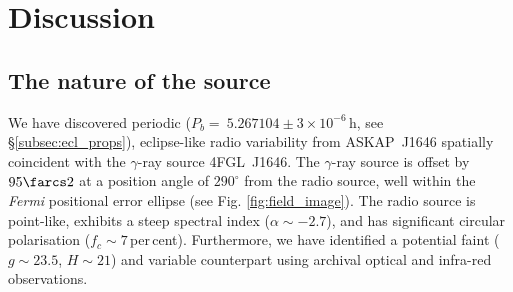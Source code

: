 \documentclass[fleqn,usenatbib]{mnras}
\newcommand{\todo}[1]{\textcolor{red}{TODO: #1}\PackageWarning{TODO:}{#1!}}
\newcommand{\fermi}{\textit{Fermi}}
\newcommand{\blinky}{{4FGL}~J1646}
\newcommand{\blinkyaskap}{{ASKAP}~J1646}
\newcommand{\periodh}{$5.267104\pm{3\times 10^{-6}}$}
\begin{document}







\section{Discussion}\label{sec:discussion}

\subsection{The nature of the source}

We have discovered periodic ($P_b=~$\periodh{}\,h, see \S\ref{subsec:ecl_props}), eclipse-like radio variability from \blinkyaskap{} spatially coincident with the $\gamma$-ray source \blinky{}. The $\gamma$-ray source is offset by $95\farcs 2$ at a position angle of $290^\circ$ from the radio source, well within the \textit{Fermi} positional error ellipse (see Fig. \ref{fig:field_image}). The radio source is point-like, exhibits a steep spectral index ($\alpha\sim -2.7$), and has significant circular polarisation ($f_c\sim 7$\,per\,cent). Furthermore, we have identified a potential faint ($g \sim 23.5$, $H\sim 21$) and variable counterpart using archival optical and infra-red observations.  
\end{document}
